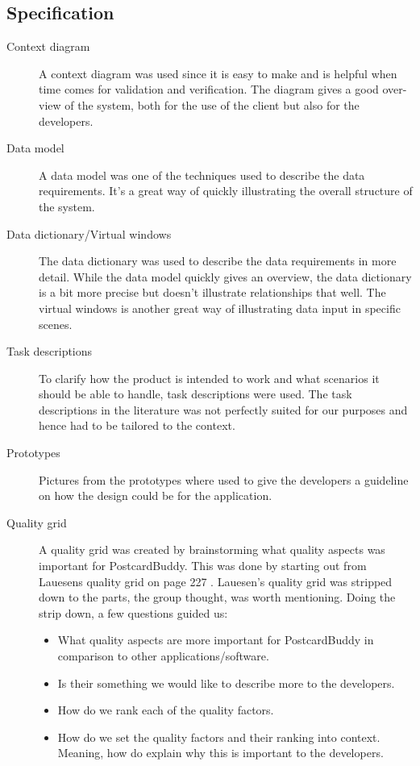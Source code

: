 \documentclass[10pt,a4paper]{article}
\begin{document}
\subsection{Specification}

\begin{description}
\item[Context diagram] A context diagram was used since it is easy to make and is helpful when time comes for validation and verification. The diagram gives a good over-view of the system, both for the use of the client but also for the developers. 

\item[Data model] A data model was one of the techniques used to describe the data requirements. It's a great way of quickly illustrating the overall structure of the system. 

\item[Data dictionary/Virtual windows] The data dictionary was used to describe the data requirements in more detail. While the data model quickly gives an overview, the data dictionary is a bit more precise but doesn't illustrate relationships that well. The virtual windows is another great way of illustrating data input in specific scenes. 

\item[Task descriptions] To clarify how the product is intended to work and what scenarios it should be able to handle, task descriptions were used. The task descriptions in the literature was not perfectly suited for our purposes and hence had to be tailored to the context. 

\item[Prototypes] Pictures from the prototypes where used to give the developers a guideline on how the design could be for the application.

\item[Quality grid]
A quality grid was created by brainstorming what quality aspects was important for PostcardBuddy. This was done by starting out from Lauesens quality grid on page 227 \cite{soren}. Lauesen's quality grid was stripped down to the parts, the group thought, was worth mentioning. Doing the strip down, a few questions guided us:
\begin{itemize}
\item What quality aspects are more important for PostcardBuddy in comparison to other applications/software.
\item Is their something we would like to describe more to the developers.
\item How do we rank each of the quality factors.
\item How do we set the quality factors and their ranking into context. Meaning, how do explain why this is important to the developers.
\end{itemize}


\end{description}
\end{document}

